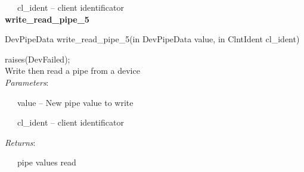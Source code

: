 ~~~cl\_ident – client identificator\\

\textbf{write\_read\_pipe\_5}

DevPipeData write\_read\_pipe\_5(in DevPipeData value, in ClntIdent
cl\_ident)

raises(DevFailed);\\

Write then read a pipe from a device\\

\emph{Parameters}:

~~~value – New pipe value to write

~~~cl\_ident – client identificator

\emph{Returns}:

~~~pipe values read
